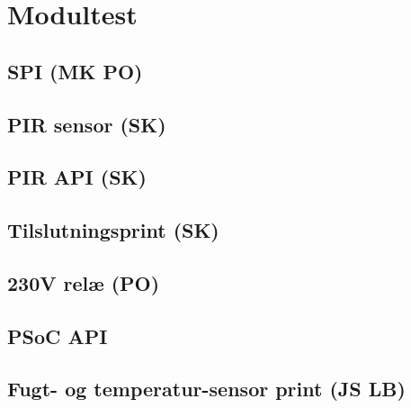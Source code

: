 \chapter{Modultest}

\section{SPI (MK PO)}


\section{PIR sensor (SK)}


\section{PIR API (SK)}


\section{Tilslutningsprint (SK)}


\section{230V relæ (PO)}


\section{PSoC API}


\section{Fugt- og temperatur-sensor print (JS LB)}




